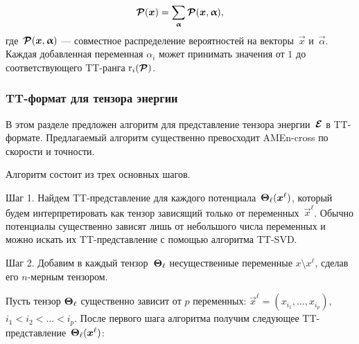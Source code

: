 \begin{equation}
\boldsymbol{\mathcal{P}}(\boldsymbol{x}) = \sum_{\boldsymbol{\upalpha}} \boldsymbol{\mathcal{P}}(\boldsymbol{x}, \boldsymbol{\upalpha}),
\end{equation}
где~$\boldsymbol{\mathcal{P}}(\boldsymbol{x}, \boldsymbol{\upalpha})$ --- совместное распределение вероятностей на векторы~$\vec{x}$ и~$\vec{\alpha}$.
Каждая добавленная переменная $\alpha_i$ может принимать значения от $1$ до соответствующего TT\hyp{}ранга $\operatorname{r}_i(\boldsymbol{\mathcal{P}})$.


\subsubsection{TT\hyp{}формат для тензора энергии}
\label{sec:energy-representation}

В этом разделе предложен алгоритм для представление тензора энергии~$\boldsymbol{\mathcal{E}}$ в TT\hyp{}формате. Предлагаемый алгоритм существенно превосходит AMEn-cross по скорости и точности.

Алгоритм состоит из трех основных шагов.

Шаг 1. Найдем TT\hyp{}представление для каждого потенциала~$\boldsymbol{\Theta}_\ell(\boldsymbol{x}^\ell)$, который будем интерпретировать как тензор зависящий только от переменных~$\vec{x}^\ell$. Обычно потенциалы существенно зависят лишь от небольшого числа переменных и можно искать их TT\hyp{}представление с помощью алгоритма TT-SVD.

Шаг 2. Добавим в каждый тензор~$\boldsymbol{\Theta}_\ell$ несущественные переменные $x \setminus x^\ell$, сделав его $n$-мерным тензором.

Пусть тензор $\boldsymbol{\Theta}_\ell$ существенно зависит от $p$ переменных: $\vec{x}^\ell = (x_{i_1}, \ldots, x_{i_p})$, $i_1 < i_2 < \ldots < i_p$. После первого шага алгоритма получим следующее TT\hyp{}представление~$\boldsymbol{\Theta}_\ell(\boldsymbol{x}^\ell)$:

